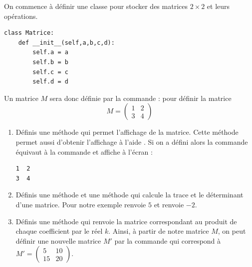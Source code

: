\documentclass[11pt,class=report,crop=false]{standalone}
\begin{document}
\begin{activite}[Matrices]



On commence à définir une classe  pour stocker des matrices $2\times2$ et leurs opérations.

\begin{lstlisting}
class Matrice:
    def __init__(self,a,b,c,d):
        self.a = a
        self.b = b
        self.c = c
        self.d = d
\end{lstlisting} 


Un matrice $M$ sera donc définie par la commande :
pour définir la matrice 
$$M = \begin{pmatrix}1&2\\3&4\end{pmatrix}$$ 

\begin{enumerate}
  \item Définis une méthode  qui permet l'affichage de la matrice.
Cette méthode permet aussi d'obtenir l'affichage à l'aide .
Si on a défini  alors la commande   équivaut à la commande  
 et affiche à l'écran :
\begin{center}
\begin{minipage}{0.6\textwidth}
\begin{lstlisting}
1  2
3  4
\end{lstlisting} 
\end{minipage}
\end{center} 
  
  
  \item Définis une méthode  et une méthode 
  qui calcule la trace et le déterminant d'une matrice.
  Pour notre exemple  renvoie $5$ et  renvoie $-2$.
  
  \item Définis une méthode  qui renvoie la matrice correspondant au produit de chaque coefficient par le réel $k$. 
 Ainsi, à partir de notre matrice $M$, on peut définir une nouvelle matrice $M'$ par la commande  qui correspond à 
 $M' = \begin{pmatrix}5&10\\15&20\end{pmatrix}$.
   

\end{enumerate}
\end{activite}
\end{document}
